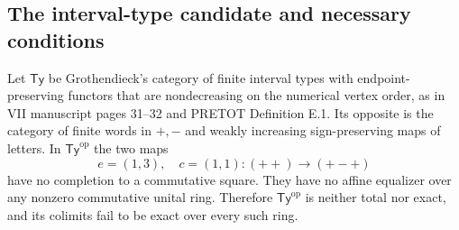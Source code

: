 \subsection{The interval-type candidate and necessary conditions}

\begin{proposition}
\label{C:lead8}
Let $\mathsf{Ty}$ be Grothendieck's category of finite interval
types with endpoint-preserving functors that are nondecreasing
on the numerical vertex order, as in VII manuscript pages
31--32 and PRETOT Definition E.1. Its opposite is the category
of finite words in $+,-$ and weakly increasing sign-preserving
maps of letters. In $\mathsf{Ty}^{\mathrm{op}}$ the two maps
\[
 e=(1,3),\quad c=(1,1):(++)\longrightarrow (+-+)
\]
have no completion to a commutative square. They have no affine
equalizer over any nonzero commutative unital ring. Therefore
$\mathsf{Ty}^{\mathrm{op}}$ is neither total nor exact, and its
colimits fail to be exact over every such ring.
\end{proposition}
